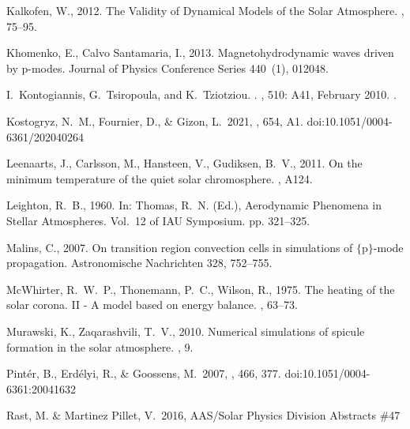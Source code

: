 \documentclass[linenumbers]{aastex63}
\begin{document}
\begin{thebibliography}{}
{Kalkofen}, W., 2012. {The Validity of Dynamical Models of the Solar
  Atmosphere}. , 75--95.

{Khomenko}, E., {Calvo Santamaria}, I., 2013. {Magnetohydrodynamic waves driven
  by p-modes}. Journal of Physics Conference Series 440~(1), 012048.


I.~{Kontogiannis}, G.~{Tsiropoula}, and K.~{Tziotziou}.
.
\newblock \emph{\aap}, 510: A41, February 2010.
\newblock {}.

 Kostogryz, N.~M., Fournier, D., \& Gizon, L.\ 2021, \aap, 654, A1. doi:10.1051/0004-6361/202040264



{Leenaarts}, J., {Carlsson}, M., {Hansteen}, V., {Gudiksen}, B.~V., 2011. {On
  the minimum temperature of the quiet solar chromosphere}. , A124.


{Leighton}, R.~B., 1960. In: {Thomas}, R.~N. (Ed.), Aerodynamic Phenomena in
  Stellar Atmospheres. Vol.~12 of IAU Symposium. pp. 321--325.

{Malins}, C., 2007. {On transition region convection cells in simulations of
  $\{$p$\}$-mode propagation}. Astronomische Nachrichten 328, 752--755.


{McWhirter}, R.~W.~P., {Thonemann}, P.~C., {Wilson}, R., 1975. {The heating of
  the solar corona. II - A model based on energy balance}. , 63--73.

{Murawski}, K., {Zaqarashvili}, T.~V., 2010. {Numerical simulations of spicule
  formation in the solar atmosphere}. , 9.

 Pint{\'e}r, B., Erd{\'e}lyi, R., \& Goossens, M.\ 2007, \aap, 466, 377. doi:10.1051/0004-6361:20041632

 Rast, M. \& Martinez Pillet, V.\ 2016, AAS/Solar Physics Division Abstracts \#47



\end{thebibliography}
\end{document}
